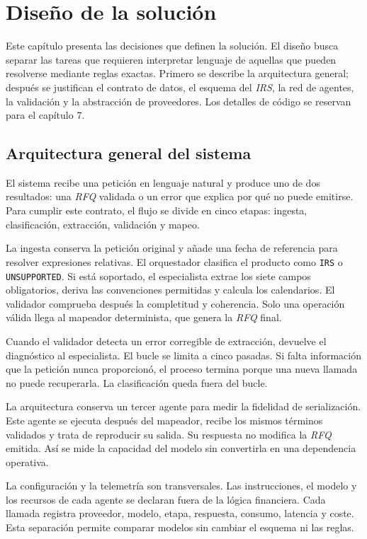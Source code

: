 \chapter{Diseño de la solución}
\label{cap:diseno}

Este capítulo presenta las decisiones que definen la solución. El diseño busca separar las tareas que requieren interpretar lenguaje de aquellas que pueden resolverse mediante reglas exactas. Primero se describe la arquitectura general; después se justifican el contrato de datos, el esquema del \textit{IRS}, la red de agentes, la validación y la abstracción de proveedores. Los detalles de código se reservan para el capítulo 7.

\section{Arquitectura general del sistema}
\label{sec:arquitectura_general}

El sistema recibe una petición en lenguaje natural y produce uno de dos resultados: una \textit{RFQ} validada o un error que explica por qué no puede emitirse. Para cumplir este contrato, el flujo se divide en cinco etapas: ingesta, clasificación, extracción, validación y mapeo.

La ingesta conserva la petición original y añade una fecha de referencia para resolver expresiones relativas. El orquestador clasifica el producto como \texttt{IRS} o \texttt{UNSUPPORTED}. Si está soportado, el especialista extrae los siete campos obligatorios, deriva las convenciones permitidas y calcula los calendarios. El validador comprueba después la completitud y coherencia. Solo una operación válida llega al mapeador determinista, que genera la \textit{RFQ} final.

Cuando el validador detecta un error corregible de extracción, devuelve el diagnóstico al especialista. El bucle se limita a cinco pasadas. Si falta información que la petición nunca proporcionó, el proceso termina porque una nueva llamada no puede recuperarla. La clasificación queda fuera del bucle.

La arquitectura conserva un tercer agente para medir la fidelidad de serialización. Este agente se ejecuta después del mapeador, recibe los mismos términos validados y trata de reproducir su salida. Su respuesta no modifica la \textit{RFQ} emitida. Así se mide la capacidad del modelo sin convertirla en una dependencia operativa.

La configuración y la telemetría son transversales. Las instrucciones, el modelo y los recursos de cada agente se declaran fuera de la lógica financiera. Cada llamada registra proveedor, modelo, etapa, respuesta, consumo, latencia y coste. Esta separación permite comparar modelos sin cambiar el esquema ni las reglas.

